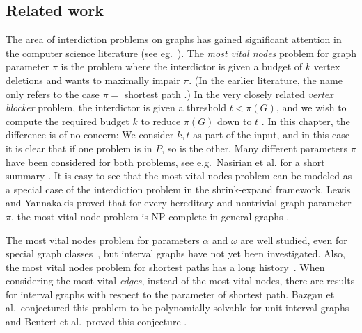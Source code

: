 \subsection{Related work}
The area of interdiction problems on graphs has gained significant attention in 
the computer science literature (see eg.~\cite{NetworkInterdictProblemsBookChapter}).
The \emph{most vital nodes} problem for graph parameter $\pi$ is the problem where the interdictor is given a budget of $k$ vertex deletions and wants to maximally impair $\pi$. (In the earlier literature, the name only refers to the case $\pi =$  shortest path \cite{mostVitalLinksNodes1982}.)  In the very closely related \emph{vertex blocker} problem, the interdictor is given a threshold $t < \pi(G)$, and we wish to compute the required budget $k$ to reduce $\pi(G)$ down to $t$ \cite{shortPathsInterdictionTotalAndNodeWise}. In this chapter, the difference is of no concern: We consider $k, t$ as part of the input, and in this case it is clear that if one problem is in $P$, so is the other. Many different parameters $\pi$ have been considered for both problems, see e.g.\ Nasirian et al. for a short summary \cite{nasirian2019exact}.
It is easy to see that the most vital nodes problem can be modeled as a special case of the interdiction problem in the shrink-expand framework.
Lewis and Yannakakis proved that for every hereditary and nontrivial graph parameter $\pi$, 
the most vital node problem is NP-complete in general graphs \cite{metaTheoremHereditary}.
 
The most vital nodes problem for parameters $\alpha$ and $\omega$ are well studied, 
even for special graph classes~\cite{mostVitalNodesWrtIndSet,costa2011minimum},
but interval graphs have not yet been investigated. Also, the most vital nodes 
problem for shortest paths has a long history~\cite{baier2010length,complexityOfFindingMostVitalNodesShortestPath,mostVitalLinksNodes1982,shortPathsInterdictionTotalAndNodeWise}.
When considering the most vital \emph{edges}, instead of the most vital nodes, there are results for interval graphs with respect to the parameter of shortest path. Bazgan et al.\ conjectured this problem to be polynomially solvable for unit interval graphs \cite{bazgan2019more} and Bentert et al.\ proved this conjecture \cite{bentert2019lengthboundedcuts}.



